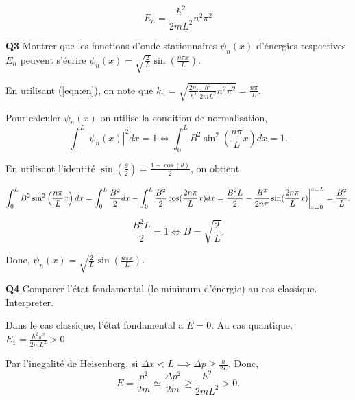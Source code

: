 \documentclass[french]{article}
\begin{document}
{	\begin{equation}
		\label{eqn:en}
		E_n = \frac{\hbar^2}{2mL^2}n^2\pi^2
	\end{equation}
	
	\begin{tcolorbox}[colback=gray!5!white,colframe=gray!75!black]
		\textbf{\large{Q3}} Montrer que les fonctions d'onde stationnaires $\psi_n(x)$ d'énergies respectives $E_n$ peuvent s'écrire $\psi_n(x) = \sqrt{\frac{2}{L}}\sin(\frac{n \pi x}{L})$.
	\end{tcolorbox}
	En utilisant (\ref{eqn:en}), on note que $k_n = \sqrt{\frac{2m}{\hbar^2} \frac{\hbar^2}{2mL^2}n^2\pi^2} = \frac{n \pi}{L}$.
	
	Pour calculer $\psi_n(x)$ on utilise la condition de normalisation,
	\begin{equation}
		\int_{0}^{L} |\psi_n(x)|^2 dx = 1 \iff \int_{0}^{L} B^2 \sin^2\left(\frac{n\pi}{L}x\right) dx = 1.
	\end{equation}
	
	En utilisant l'identité $\sin(\frac{\theta}{2}) = \frac{1 - \cos(\theta)}{2}$, on obtient
	
	\begin{dmath}
		\int_{0}^{L} B^2 \sin^2\left(\frac{n\pi}{L}x\right) dx = \int_{0}^{L} \frac{B^2}{2} dx - \int_{0}^{L} \frac{B^2}{2}\cos(\frac{2n\pi}{L}x) dx \\
		= \frac{B^2L}{2} - \frac{B^2}{2n\pi}\sin(\frac{2n\pi}{L}x)\bigg\rvert_{x=0}^{x=L}\\
		= \frac{B^2}{L}.
	\end{dmath}
	
	\begin{equation}
		\frac{B^2 L}{2} = 1 \iff B = \sqrt{\frac{2}{L}}.
	\end{equation}
	
	Donc, $\psi_n(x) = \sqrt{\frac{2}{L}}\sin(\frac{n \pi x}{L})$.
	
	\begin{tcolorbox}[colback=gray!5!white,colframe=gray!75!black]
		\textbf{\large{Q4}} Comparer l'état fondamental (le minimum d'énergie) au cas classique. Interpreter.
	\end{tcolorbox}

	Dans le cas classique, l'état fondamental a $E=0$.
	Au cas quantique, $E_1 = \frac{\hbar^2 \pi^2}{2mL^2} > 0$
	
	Par l'inegalité de Heisenberg, si $\Delta x < L \implies \Delta p \geq \frac{\hbar}{2L}$. Donc,
	\begin{equation}
		E = \frac{p^2}{2m} \simeq \frac{\Delta p^2}{2m} \geq \frac{\hbar^2}{2mL^2} > 0.
	\end{equation}
	
}
\end{document}
